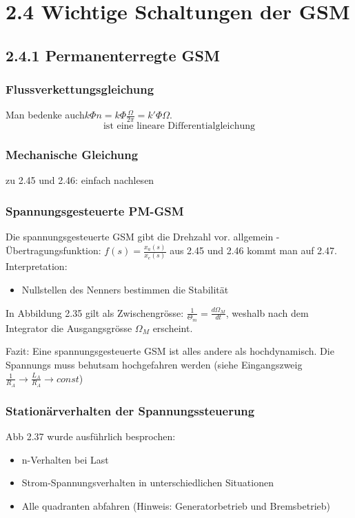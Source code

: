 \documentclass[a4paper]{article}
\begin{document}
\section*{2.4 Wichtige Schaltungen der GSM}
\subsection*{2.4.1 Permanenterregte GSM}
\subsubsection*{Flussverkettungsgleichung}
Man bedenke auch$ k\Phi n=k\Phi \frac{\Omega}{2\pi} =k'\Phi\Omega$.
\begin{equation}\label{2.39} \text{ist eine lineare Differentialgleichung} \end{equation}

\subsubsection*{Mechanische Gleichung}
zu 2.45 und 2.46: einfach nachlesen

\subsubsection*{Spannungsgesteuerte PM-GSM}
Die spannungsgesteuerte GSM gibt die Drehzahl vor.
allgemein - Übertragungsfunktion: $f(s)=\frac{x_{a}(s)}{x_{e}(s)}$\newline
aus 2.45 und 2.46 kommt man auf 2.47.\newline
Interpretation:
\begin{itemize}
    \item Nullstellen des Nenners bestimmen die Stabilität
\end{itemize}
In Abbildung 2.35 gilt als Zwischengrösse: $\frac{1}{\Theta_{m}}=\frac{d\Omega_{M}}{dt}$, weshalb nach dem Integrator die Ausgangsgrösse $\Omega_{M}$ erscheint.

Fazit: Eine spannungsgesteuerte GSM ist alles andere als hochdynamisch. Die Spannungs muss behutsam hochgefahren werden (siehe Eingangszweig $\frac{1}{R_{A}}\to \frac{L_{A}}{R_{A}}\to const$)


\subsubsection*{Stationärverhalten der Spannungssteuerung}
Abb 2.37 wurde ausführlich besprochen:
\begin{itemize}
    \item n-Verhalten bei Last
    \item Strom-Spannungsverhalten in unterschiedlichen Situationen
    \item Alle quadranten abfahren (Hinweis: Generatorbetrieb und Bremsbetrieb)
\end{itemize}
\end{document}
